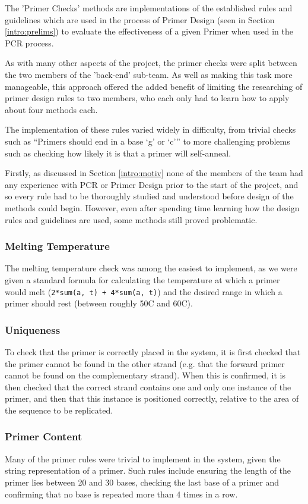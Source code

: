 The 'Primer Checks' methods are implementations of the established rules
and guidelines which are used in the process of Primer Design (seen in
Section \ref{intro:prelims}) to evaluate the effectiveness of a given 
Primer when used in the PCR process.

As with many other aspects of the project, the primer checks were split
between the two members of the 'back-end' sub-team. As well as making
this task more manageable, this approach offered the added benefit of
limiting the researching of primer design rules to two members, who each
only had to learn how to apply about four methods each.

The implementation of these rules varied widely in difficulty, from
trivial checks such as ``Primers should end in a base `g' or `c''' to
more challenging problems such as checking how likely it is that a primer  
will self-anneal.

Firstly, as discussed in Section \ref{intro:motiv} none of the members of 
the team had any experience with PCR or Primer Design prior to the start of 
the project, and so every rule had to be thoroughly studied and understood 
before design of the methods could begin. However, even after spending time 
learning how the design rules and guidelines are used, some methods still 
proved problematic.

\subsubsection{Melting Temperature}
The melting temperature check was among the easiest to implement, as we
were given a standard formula for calculating the temperature at which a 
primer would melt (\texttt{2*sum(a, t) + 4*sum(a, t)}) and the desired 
range in which a primer should rest (between roughly 50\degree C and 
60\degree C).

\subsubsection{Uniqueness}
To check that the primer is correctly placed in the system, it is first checked
that the primer cannot be found in the other strand (e.g. that the forward
primer cannot be found on the complementary strand). When this is confirmed,
it is then checked that the correct strand contains one and only one instance
of the primer, and then that this instance is positioned correctly, relative
to the area of the sequence to be replicated.

\subsubsection{Primer Content}
Many of the primer rules were trivial to implement in the system, given
the string representation of a primer. Such rules include ensuring the
length of the primer lies between 20 and 30 bases, checking the last base
of a primer and confirming that no base is repeated more than 4 times
in a row. 

